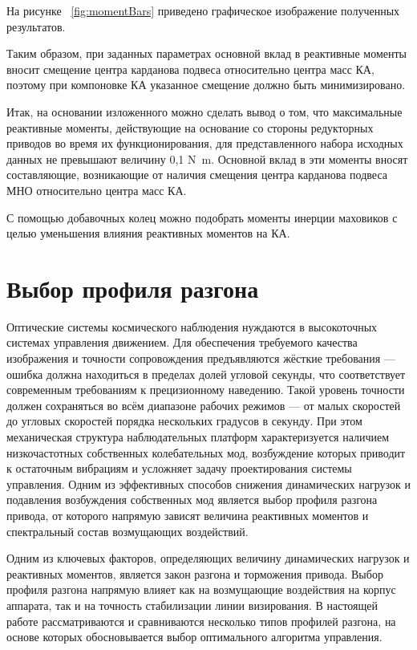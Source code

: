 На рисунке ~\cref{fig:momentBars} приведено графическое изображение полученных результатов.

Таким образом, при заданных параметрах основной вклад в реактивные моменты вносит смещение центра карданова подвеса относительно центра масс КА, поэтому при компоновке КА указанное смещение должно быть минимизировано.

Итак, на основании изложенного можно сделать вывод о том, что максимальные реактивные моменты, действующие на основание со стороны редукторных приводов во время их функционирования, для представленного набора исходных данных не превышают величину 0,1 \si{\newton\metre}.  Основной вклад в эти моменты вносят составляющие, возникающие от наличия смещения центра карданова подвеса МНО относительно центра масс КА.

С помощью добавочных колец можно подобрать моменты инерции маховиков с целью уменьшения влияния реактивных моментов на КА.








\section{Выбор профиля разгона}

Оптические системы космического наблюдения нуждаются в высокоточных системах управления движением. Для обеспечения требуемого качества изображения и точности сопровождения предъявляются жёсткие требования — ошибка должна находиться в пределах долей угловой секунды, что соответствует современным требованиям к прецизионному наведению. Такой уровень точности должен сохраняться во всём диапазоне рабочих режимов — от малых скоростей до угловых скоростей порядка нескольких градусов в секунду. При этом механическая структура наблюдательных платформ характеризуется наличием низкочастотных собственных колебательных мод, возбуждение которых приводит к остаточным вибрациям и усложняет задачу проектирования системы управления. Одним из эффективных способов снижения динамических нагрузок и подавления возбуждения собственных мод является выбор профиля разгона привода, от которого напрямую зависят величина реактивных моментов и спектральный состав возмущающих воздействий.

Одним из ключевых факторов, определяющих величину динамических нагрузок и реактивных моментов, является закон разгона и торможения привода. Выбор профиля разгона напрямую влияет как на возмущающие воздействия на корпус аппарата, так и на точность стабилизации линии визирования. В настоящей работе рассматриваются и сравниваются несколько типов профилей разгона, на основе которых обосновывается выбор оптимального алгоритма управления.




